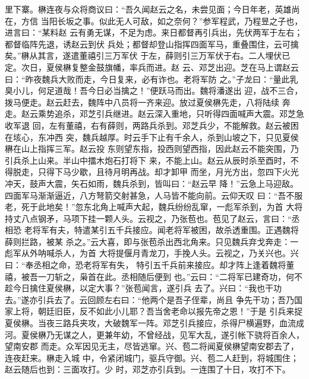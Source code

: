 里下寨。楙连夜与众将商议曰：“吾久闻赵云之名，未尝见面；今日年老，英雄尚在，方信
当阳长坂之事。似此无人可敌，如之奈何？”参军程武，乃程昱之子也，进言曰：“某料赵
云有勇无谋，不足为虑。来日都督再引兵出，先伏两军于左右；都督临阵先退，诱赵云到伏
兵处；都督却登山指挥四面军马，重叠围住，云可擒矣。”楙从其言，遂遣董禧引三万军伏
于左，薛则引三万军伏于右。二人埋伏已定。次日，夏侯楙复整金鼓旗幡，率兵而进。赵
云、邓芝出迎。芝在马上谓赵云曰：“昨夜魏兵大败而走，今日复来，必有诈也。老将军防
之。”子龙曰：“量此乳臭小儿，何足道哉！吾今日必当擒之！”便跃马而出。魏将潘遂出
迎，战不三合，拨马便走。赵云赶去，魏阵中八员将一齐来迎。放过夏侯楙先走，八将陆续
奔走。赵云乘势追杀，邓芝引兵继进。赵云深入重地，只听得四面喊声大震。邓芝急收军退
回，左有董禧，右有薛则，两路兵杀到。邓芝兵少，不能解救。赵云被困在垓心，东冲西
突，魏兵越厚。时云手下止有千余人，杀到山坡之下，只见夏侯楙在山上指挥三军。赵云投
东则望东指，投西则望西指，因此赵云不能突围，乃引兵杀上山来。半山中擂木炮石打将下
来，不能上山。赵云从辰时杀至酉时，不得脱走，只得下马少歇，且待月明再战。却才卸甲
而坐，月光方出，忽四下火光冲天，鼓声大震，矢石如雨，魏兵杀到，皆叫曰：“赵云早
降！”云急上马迎敌。四面军马渐渐逼近，八方弩箭交射甚急，人马皆不能向前。云仰天叹
曰：“吾不服老，死于此地矣！”忽东北角上喊声大起，魏兵纷纷乱窜，一彪军杀到，为首
大将持丈八点钢矛，马项下挂一颗人头。云视之，乃张苞也。苞见了赵云，言曰：“丞相恐
老将军有夫，特遣某引五千兵接应。闻老将军被困，故杀透重围。正遇魏将薛则拦路，被某
杀之。”云大喜，即与张苞杀出西北角来。只见魏兵弃戈奔走：一彪军从外呐喊杀人，为首
大将提偃月青龙刀，手挽人头。云视之，乃关兴也。兴曰：“奉丞相之命，恐老将军有失，
特引五千兵前来接应。却才阵上逢着魏将董禧，被吾一刀斩之，枭首在此。丞相随后便到
也。”云曰：“二将军已建奇功，何不趁今日擒住夏侯楙，以定大事？”张苞闻言，遂引兵
去了。兴曰：“我也干功去。”遂亦引兵去了。云回顾左右曰：“他两个是吾子侄辈，尚且
争先干功；吾乃国家上将，朝廷旧臣，反不如此小儿耶？吾当舍老命以报先帝之恩！”于是
引兵来捉夏侯楙。当夜三路兵夹攻，大破魏军一阵。邓芝引兵接应，杀得尸横遍野，血流成
河。夏侯楙乃无谋之人，更兼年幼，不曾经战，见军大乱，遂引帐下骁将百余人，望南安郡
而走。众军因见无主，尽皆逃窜。兴、苞二将闻夏侯楙望南安郡去了，连夜赶来。楙走入城
中，令紧闭城门，驱兵守御。兴、苞二人赶到，将城围住；赵云随后也到：三面攻打。少
时，邓芝亦引兵到。一连围了十日，攻打不下。

